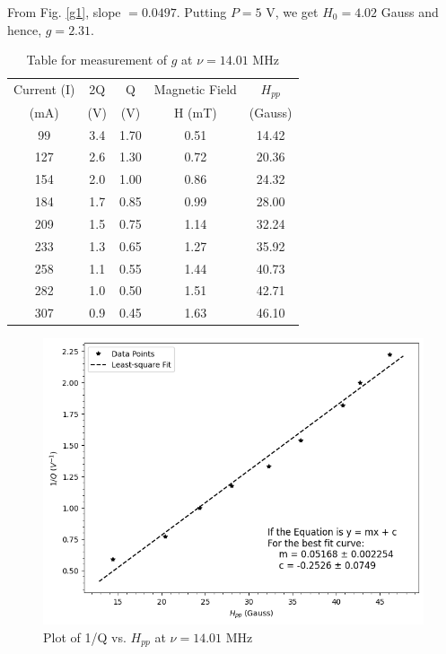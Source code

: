 From Fig. \ref{g1}, slope $= 0.0497$. Putting $P=5$ V, we get $H_0=4.02$ Gauss and hence, $g=2.31$.

\begin{table}[H]
    \centering
        \caption{Table for measurement of $g$ at $\nu= 14.01$ MHz}
        \begin{tabular}{|c|c|c|c|c|} \hline
        Current (I) & 2Q & Q & Magnetic Field & $H_{pp}$ \\ 
        (mA) & (V) & (V) & H (mT) & (Gauss)\\ \hline
        99 & 3.4 & 1.70  & 0.51 & 14.42 \\
        127 & 2.6 & 1.30  & 0.72 & 20.36 \\
        154 & 2.0   & 1.00    & 0.86 & 24.32 \\
        184 & 1.7 & 0.85 & 0.99 & 28.00    \\
        209 & 1.5 & 0.75 & 1.14 & 32.24 \\
        233 & 1.3 & 0.65 & 1.27 & 35.92 \\
        258 & 1.1 & 0.55 & 1.44 & 40.73 \\
        282 & 1.0   & 0.50  & 1.51 & 42.71 \\
        307 & 0.9 & 0.45 & 1.63 & 46.10  \\ \hline
    \end{tabular}    
    \label{tab:2}
\end{table}

\begin{figure}[H]
    \centering
    \includegraphics[width=1\columnwidth]{images/2.png}
    \caption{Plot of 1/Q vs. $H_{pp}$ at $\nu=14.01$ MHz}
    \label{g2}
\end{figure}

